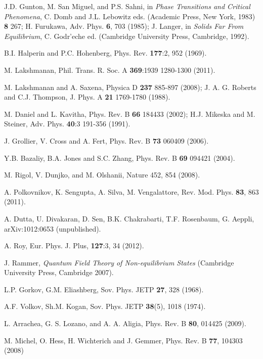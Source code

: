 \documentclass[a4paper,11pt,color]{article}
\renewenvironment{thebibliography}[1]{%
    \begin{oldthebibliography}{#1}%
      \setlength{\parskip}{0ex}%
      \setlength{\itemsep}{0ex}%
  }%
  {%
    \end{oldthebibliography}%
  }
\begin{document}
\begin{thebibliography}{}

J.D. Gunton, M. San Miguel, and P.S. Sahni, in \textit{Phase Transitions and Critical Phenomena}, C. Domb
and J.L. Lebowitz eds. (Academic Press, New York, 1983)  {\bf 8} 267; H. Furukawa, Adv. Phys. {\bf 6}, 703 (1985);
J. Langer, in \textit{Solids Far From Equilibrium}, C. Godr'eche ed. (Cambridge University Press, Cambridge, 1992).

B.I. Halperin and P.C. Hohenberg, Phys. Rev. {\bf 177}:2, 952 (1969).

M. Lakshmanan,  Phil. Trans. R. Soc. A {\bf 369}:1939 1280-1300 (2011).

M. Lakshmanan and A. Saxena, Physica D {\bf 237} 885-897 (2008); J. A. G. Roberts and C.J. Thompson, J. Phys. A {\bf 21} 1769-1780 (1988).

M. Daniel and L. Kavitha, Phys. Rev. B {\bf 66} 184433 (2002); H.J. Mikeska and M. Steiner, Adv. Phys. {\bf40}:3 191-356 (1991). 

J. Grollier, V. Cross  and A. Fert, Phys. Rev. B {\bf 73} 060409 (2006).

Y.B. Bazaliy, B.A. Jones and S.C. Zhang, Phys. Rev. B {\bf 69} 094421 (2004).

M. Rigol, V. Dunjko, and M. Olshanii, Nature 452, 854 (2008).

A. Polkovnikov, K. Sengupta, A. Silva, M. Vengalattore, Rev. Mod. Phys. \textbf{83}, 863 (2011).

A. Dutta, U. Divakaran, D. Sen, B.K. Chakrabarti, T.F. Rosenbaum, G. Aeppli, arXiv:1012:0653 (unpublished).

A. Roy, Eur. Phys. J. {Plus}, {\bf 127}:3, 34 (2012).

J. Rammer, \textit{Quantum Field Theory of Non-equilibrium States} (Cambridge University Press, Cambridge 2007).

L.P. Gorkov, G.M. Eliashberg, Sov. Phys. JETP \textbf{27}, 328 (1968).

A.F. Volkov, Sh.M. Kogan, Sov. Phys. JETP \textbf{38}(5), 1018 (1974).

L. Arrachea, G. S. Lozano, and A. A. Aligia, Phys. Rev. B {\bf 80}, 014425 (2009).

M. Michel, O. Hess,  H. Wichterich and J. Gemmer, Phys. Rev. B {\bf 77}, 104303 (2008) 


\end{thebibliography}
\end{document}
